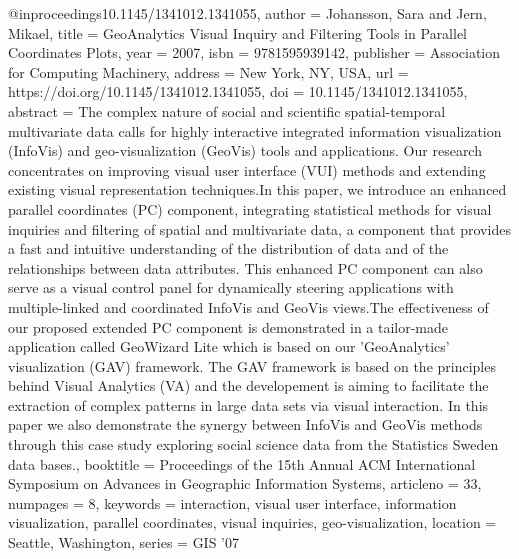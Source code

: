 @inproceedings{10.1145/1341012.1341055,
author = {Johansson, Sara and Jern, Mikael},
title = {GeoAnalytics Visual Inquiry and Filtering Tools in Parallel Coordinates Plots},
year = {2007},
isbn = {9781595939142},
publisher = {Association for Computing Machinery},
address = {New York, NY, USA},
url = {https://doi.org/10.1145/1341012.1341055},
doi = {10.1145/1341012.1341055},
abstract = {The complex nature of social and scientific spatial-temporal multivariate data calls for highly interactive integrated information visualization (InfoVis) and geo-visualization (GeoVis) tools and applications. Our research concentrates on improving visual user interface (VUI) methods and extending existing visual representation techniques.In this paper, we introduce an enhanced parallel coordinates (PC) component, integrating statistical methods for visual inquiries and filtering of spatial and multivariate data, a component that provides a fast and intuitive understanding of the distribution of data and of the relationships between data attributes. This enhanced PC component can also serve as a visual control panel for dynamically steering applications with multiple-linked and coordinated InfoVis and GeoVis views.The effectiveness of our proposed extended PC component is demonstrated in a tailor-made application called GeoWizard Lite which is based on our 'GeoAnalytics' visualization (GAV) framework. The GAV framework is based on the principles behind Visual Analytics (VA) and the developement is aiming to facilitate the extraction of complex patterns in large data sets via visual interaction. In this paper we also demonstrate the synergy between InfoVis and GeoVis methods through this case study exploring social science data from the Statistics Sweden data bases.},
booktitle = {Proceedings of the 15th Annual ACM International Symposium on Advances in Geographic Information Systems},
articleno = {33},
numpages = {8},
keywords = {interaction, visual user interface, information visualization, parallel coordinates, visual inquiries, geo-visualization},
location = {Seattle, Washington},
series = {GIS '07}
}